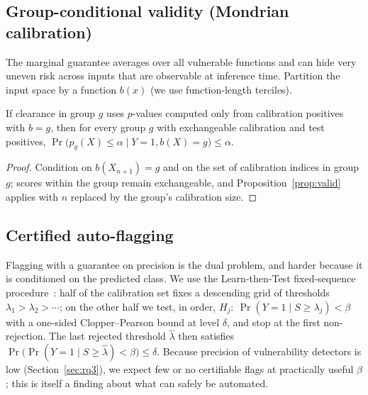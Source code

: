 \subsection{Group-conditional validity (Mondrian calibration)}
The marginal guarantee averages over all vulnerable functions and can hide very uneven risk across inputs that are observable at inference time.
Partition the input space by a function $b(x)$ (we use function-length terciles).
\begin{proposition}\label{prop:mondrian}
If clearance in group $g$ uses $p$-values computed only from calibration positives with $b=g$, then for every group $g$ with exchangeable calibration and test positives, $\Pr\bigl(p_g(X)\le\alpha\mid Y{=}1, b(X){=}g\bigr)\le\alpha$.
\end{proposition}
\begin{proof}
Condition on $b(X_{n+1})=g$ and on the set of calibration indices in group $g$; scores within the group remain exchangeable, and Proposition~\ref{prop:valid} applies with $n$ replaced by the group's calibration size.
\end{proof}

\subsection{Certified auto-flagging}
Flagging with a guarantee on precision is the dual problem, and harder because it is conditioned on the predicted class.
We use the Learn-then-Test fixed-sequence procedure~\cite{angelopoulos2021ltt}: half of the calibration set fixes a descending grid of thresholds $\lambda_1>\lambda_2>\cdots$; on the other half we test, in order, $H_j:\ \Pr(Y{=}1\mid S\ge\lambda_j)<\beta$ with a one-sided Clopper--Pearson bound at level $\delta$, and stop at the first non-rejection. The last rejected threshold $\hat\lambda$ then satisfies $\Pr\bigl(\Pr(Y{=}1\mid S\ge\hat\lambda)<\beta\bigr)\le\delta$.
Because precision of vulnerability detectors is low (Section~\ref{sec:rq3}), we expect few or no certifiable flags at practically useful $\beta$; this is itself a finding about what can safely be automated.

